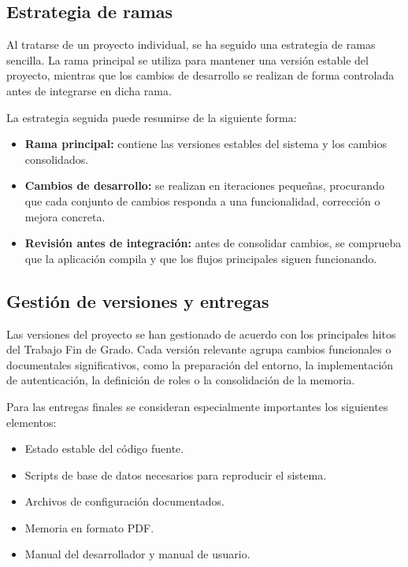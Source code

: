 \subsection{Estrategia de ramas}

Al tratarse de un proyecto individual, se ha seguido una estrategia de ramas sencilla. La rama principal se utiliza para mantener una versión estable del proyecto, mientras que los cambios de desarrollo se realizan de forma controlada antes de integrarse en dicha rama.

La estrategia seguida puede resumirse de la siguiente forma:

\begin{itemize}
    \item \textbf{Rama principal:} contiene las versiones estables del sistema y los cambios consolidados.
    \item \textbf{Cambios de desarrollo:} se realizan en iteraciones pequeñas, procurando que cada conjunto de cambios responda a una funcionalidad, corrección o mejora concreta.
    \item \textbf{Revisión antes de integración:} antes de consolidar cambios, se comprueba que la aplicación compila y que los flujos principales siguen funcionando.
\end{itemize}

\subsection{Gestión de versiones y entregas}

Las versiones del proyecto se han gestionado de acuerdo con los principales hitos del Trabajo Fin de Grado. Cada versión relevante agrupa cambios funcionales o documentales significativos, como la preparación del entorno, la implementación de autenticación, la definición de roles o la consolidación de la memoria.

Para las entregas finales se consideran especialmente importantes los siguientes elementos:

\begin{itemize}
    \item Estado estable del código fuente.
    \item Scripts de base de datos necesarios para reproducir el sistema.
    \item Archivos de configuración documentados.
    \item Memoria en formato PDF.
    \item Manual del desarrollador y manual de usuario.
\end{itemize}

